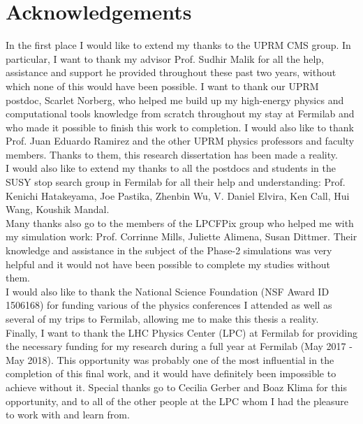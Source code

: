 \documentclass[12pt,twoside,openany]{book}
\begin{document}
\chapter*{Acknowledgements}

In the first place I would like to extend my thanks to the UPRM CMS group. In particular, I want to thank my advisor Prof. Sudhir Malik for all the help, assistance and support he provided throughout these past two years, without which none of this would have been possible. I want to thank our UPRM postdoc, Scarlet Norberg, who helped me build up my high-energy physics and computational tools knowledge from scratch throughout my stay at Fermilab and who made it possible to finish this work to completion. I would also like to thank Prof. Juan Eduardo Ramirez and the other UPRM  physics professors and faculty members. Thanks to them, this research dissertation has been made a reality. \\

I would also like to extend my thanks to all the postdocs and students in the SUSY stop search group in Fermilab for all their help and understanding: Prof. Kenichi Hatakeyama, Joe Pastika, Zhenbin Wu, V. Daniel Elvira, Ken Call, Hui Wang, Koushik Mandal.\\

Many thanks also go to the members of the LPCFPix group who helped me with my simulation work: Prof. Corrinne Mills, Juliette Alimena, Susan Dittmer. Their knowledge and assistance in the subject of the Phase-2 simulations was very helpful and it would not have been possible to complete my studies without them.\\

I would also like to thank the National Science Foundation (NSF Award ID 1506168) for funding various of the physics conferences I attended as well as several of my trips to Fermilab, allowing me to make this thesis a reality.\\

Finally, I want to thank the LHC Physics Center (LPC) at Fermilab for providing the necessary funding for my research during a full year at Fermilab (May 2017 - May 2018). This opportunity was probably one of the most influential in the completion of this final work, and it would have definitely been impossible to achieve without it. Special thanks go to Cecilia Gerber and Boaz Klima for this opportunity, and to all of the other people at the LPC whom I had the pleasure to work with and learn from. 
\end{document}
